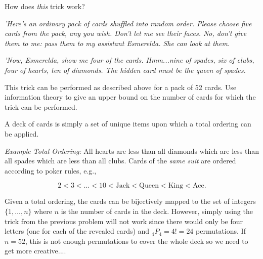 \newpage
\begin{problem}{15}{6}
  How does \textit{this} trick work?
  
  \textnormal{\textit{'Here's an ordinary pack of cards shuffled into random order.  Please choose five cards from the pack, any you wish. Don't let me see their faces. No, don't give them to me: pass them to my assistant Esmerelda.  She can look at them.}}
  
  \textnormal{\textit{'Now, Esmerelda, show me four of the cards.  Hmm...nine of spades, six of clubs, four of hearts, ten of diamonds. The hidden card must be the queen of spades.}}
  
  This trick can be performed as described above for a pack of 52 cards.  Use information theory to give an upper bound on the number of cards for which the trick can be performed.
\end{problem}

A deck of cards is simply a set of unique items upon which a total ordering can be applied.  

\textit{Example Total Ordering:} All hearts are less than all diamonds which are less than all spades which are less than all clubs.  Cards of the \textit{same suit} are ordered according to poker rules, e.g.,

\[2 < 3 < \ldots < 10 < \text{Jack} < \text{Queen} < \text{King} < \text{Ace} \text{.} \]

Given a total ordering, the cards can be bijectively mapped to the set of integers $\{1,\ldots,n\}$ where $n$ is the number of cards in the deck. However, simply using the trick from the previous problem will not work since there would only be four letters (one for each of the revealed cards) and ${}_{4}P_{4} = 4! = 24$ permutations.  If $n=52$, this is not enough permutations to cover the whole deck so we need to get more creative....


